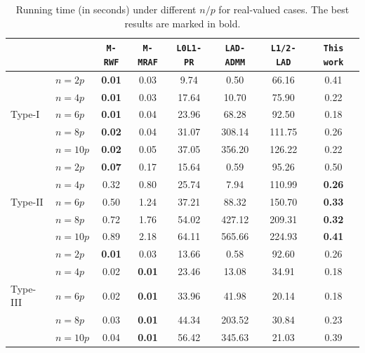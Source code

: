 \documentclass{article}
\numberwithin{equation}{section}
\begin{document}
	\begin{table}[!t]
	\centering
	\caption{Running time (in seconds) under different $n/p$ for real-valued cases. The best results are marked in bold.}\label{time1}
	\begin{tabular}{l l|c|c|c|c|c|c}
			\toprule		
		~ &~ &\verb"M-RWF"&\verb"M-MRAF"&\verb"L0L1-PR" &\verb"LAD-ADMM" &\verb"L1/2-LAD" &\verb"This work" \\ \midrule	
		&$n=2p$         &\textbf{0.01}  &0.03   &9.74    &0.50      &66.16     &0.41\\ 								
		&$n=4p$         &\textbf{0.01} &0.03   &17.64   &10.70     &75.90     &0.22\\ 									
		Type-I&$n=6p$   &\textbf{0.01}  &0.04   &23.96   &68.28     &92.50     &0.18\\ 		
		&$n=8p$         &\textbf{0.02}  &0.04   &31.07   &308.14    &111.75    &0.26\\	
		&$n=10p$        &\textbf{0.02}  &0.05   &37.05   &356.20    &126.22    &0.22\\  		
		\midrule				
		&$n=2p$        &\textbf{0.07} &0.17   &15.64   &0.59     &95.26   &0.50\\ 								
		&$n=4p$        &0.32 &0.80   &25.74   &7.94     &110.99  &\textbf{0.26}\\ 									
		Type-II&$n=6p$ &0.50 &1.24   &37.21   &88.32    &150.70  &\textbf{0.33}\\ 		
		&$n=8p$        &0.72  &1.76   &54.02   &427.12   &209.31  &\textbf{0.32}\\	
		&$n=10p$       &0.89  &2.18   &64.11   &565.66   &224.93  &\textbf{0.41}\\  		
		\midrule		
		&$n=2p$         &\textbf{0.01}  &0.03   &13.66   &0.58      &92.60   &0.26\\ 								
		&$n=4p$         &0.02  &\textbf{0.01}   &23.46   &13.08     &34.91   &0.18\\ 									
		Type-III&$n=6p$ &0.02  &\textbf{0.01}  &33.96   &41.98     &20.14   &0.18\\ 		
		&$n=8p$         &0.03  &\textbf{0.01}   &44.34   &203.52    &30.84   &0.23\\	
		&$n=10p$        &0.04  &\textbf{0.01}  &56.42   &345.63    &21.03   &0.39\\  		
	\bottomrule
	\end{tabular}
\end{table}

	
	
\end{document}
